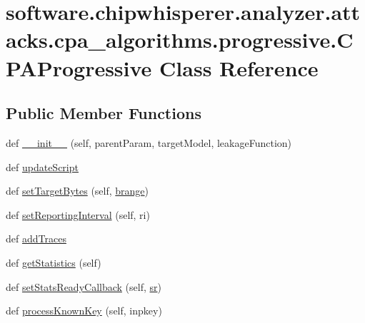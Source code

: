 \hypertarget{classsoftware_1_1chipwhisperer_1_1analyzer_1_1attacks_1_1cpa__algorithms_1_1progressive_1_1CPAProgressive}{}\section{software.\+chipwhisperer.\+analyzer.\+attacks.\+cpa\+\_\+algorithms.\+progressive.\+C\+P\+A\+Progressive Class Reference}
\label{classsoftware_1_1chipwhisperer_1_1analyzer_1_1attacks_1_1cpa__algorithms_1_1progressive_1_1CPAProgressive}
\subsection*{Public Member Functions}
\begin{DoxyCompactItemize}
\item 
def \hyperlink{classsoftware_1_1chipwhisperer_1_1analyzer_1_1attacks_1_1cpa__algorithms_1_1progressive_1_1CPAProgressive_a7bd6bd10b72a6d31d29b5e6b08c9fc28}{\+\_\+\+\_\+init\+\_\+\+\_\+} (self, parent\+Param, target\+Model, leakage\+Function)
\item 
def \hyperlink{classsoftware_1_1chipwhisperer_1_1analyzer_1_1attacks_1_1cpa__algorithms_1_1progressive_1_1CPAProgressive_a0d8e4ed1ce1f65b4d6f12d79420a56cb}{update\+Script}
\item 
def \hyperlink{classsoftware_1_1chipwhisperer_1_1analyzer_1_1attacks_1_1cpa__algorithms_1_1progressive_1_1CPAProgressive_afa0cda55ff9e5294d6812f76c697f090}{set\+Target\+Bytes} (self, \hyperlink{classsoftware_1_1chipwhisperer_1_1analyzer_1_1attacks_1_1cpa__algorithms_1_1progressive_1_1CPAProgressive_a66c873c10645a405c0994acd78cb4026}{brange})
\item 
def \hyperlink{classsoftware_1_1chipwhisperer_1_1analyzer_1_1attacks_1_1cpa__algorithms_1_1progressive_1_1CPAProgressive_ac3ad5018d84faa428c9490276f6d3e13}{set\+Reporting\+Interval} (self, ri)
\item 
def \hyperlink{classsoftware_1_1chipwhisperer_1_1analyzer_1_1attacks_1_1cpa__algorithms_1_1progressive_1_1CPAProgressive_a55f67eea78a588daf4ac0793915f62ae}{add\+Traces}
\item 
def \hyperlink{classsoftware_1_1chipwhisperer_1_1analyzer_1_1attacks_1_1cpa__algorithms_1_1progressive_1_1CPAProgressive_ac1fd9ff153da4462925073425e913d4a}{get\+Statistics} (self)
\item 
def \hyperlink{classsoftware_1_1chipwhisperer_1_1analyzer_1_1attacks_1_1cpa__algorithms_1_1progressive_1_1CPAProgressive_a9c3077e3297b58f1c2dd78ab6af76b5e}{set\+Stats\+Ready\+Callback} (self, \hyperlink{classsoftware_1_1chipwhisperer_1_1analyzer_1_1attacks_1_1cpa__algorithms_1_1progressive_1_1CPAProgressive_a106dc20059379dba40e4ef321ae35fd4}{sr})
\item 
def \hyperlink{classsoftware_1_1chipwhisperer_1_1analyzer_1_1attacks_1_1cpa__algorithms_1_1progressive_1_1CPAProgressive_a5b78b9ca46c5ed0b83013b3d640df441}{process\+Known\+Key} (self, inpkey)
\end{DoxyCompactItemize}
